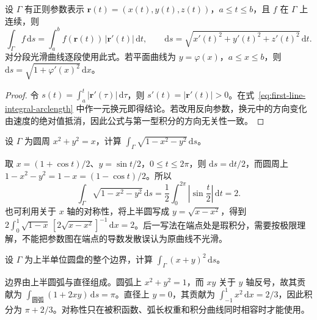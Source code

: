 \begin{theorem}
\label{thm:first-line-integral-parametric}
设 $\Gamma$ 有正则参数表示 $\boldsymbol r(t)=(x(t),y(t),z(t))$，$a\leq t\leq b$，且 $f$ 在 $\Gamma$ 上连续，则
\begin{equation}
\label{eq:first-line-integral-parametric}
    \int_\Gamma f\,\mathrm ds
    =\int_a^b f(\boldsymbol r(t))\,|\boldsymbol r'(t)|\,\mathrm dt,
    \qquad
    \mathrm ds=\sqrt{x'(t)^2+y'(t)^2+z'(t)^2}\,\mathrm dt.
\end{equation}
对分段光滑曲线逐段使用此式。若平面曲线为 $y=\varphi(x)$，$a\leq x\leq b$，则 $\mathrm ds=\sqrt{1+\varphi'(x)^2}\,\mathrm dx$。
\end{theorem}

\begin{proof}
令 $s(t)=\int_a^t|\boldsymbol r'(\tau)|\,\mathrm d\tau$，则 $s'(t)=|\boldsymbol r'(t)|>0$。在式~\eqref{eq:first-line-integral-arclength} 中作一元换元即得结论。若改用反向参数，换元中的方向变化由速度的绝对值抵消，因此公式与第一型积分的方向无关性一致。
\end{proof}

\begin{example}
\label{ex:first-line-integral-offset-circle}
设 $\Gamma$ 为圆周 $x^2+y^2=x$，计算 $\int_\Gamma\sqrt{1-x^2-y^2}\,\mathrm ds$。
\end{example}
\begin{solve}
取 $x=(1+\cos t)/2$、$y=\sin t/2$，$0\leq t\leq2\pi$，则 $\mathrm ds=\mathrm dt/2$，而圆周上 $1-x^2-y^2=1-x=(1-\cos t)/2$。所以
\[
    \int_\Gamma\sqrt{1-x^2-y^2}\,\mathrm ds
    =\frac12\int_0^{2\pi}\left|\sin\frac t2\right|\,\mathrm dt=2.
\]
也可利用关于 $x$ 轴的对称性，将上半圆写成 $y=\sqrt{x-x^2}$，得到 $2\int_0^1\sqrt{1-x}\,[2\sqrt{x-x^2}]^{-1}\,\mathrm dx=2$。后一写法在端点处是瑕积分，需要按极限理解，不能把参数图在端点的导数发散误认为原曲线不光滑。
\end{solve}

\begin{example}
\label{ex:first-line-integral-semicircle-boundary}
设 $\Gamma$ 为上半单位圆盘的整个边界，计算 $\int_\Gamma(x+y)^2\,\mathrm ds$。
\end{example}
\begin{solve}
边界由上半圆弧与直径组成。圆弧上 $x^2+y^2=1$，而 $xy$ 关于 $y$ 轴反号，故其贡献为 $\int_{\text{圆弧}}(1+2xy)\,\mathrm ds=\pi$。直径上 $y=0$，其贡献为 $\int_{-1}^1x^2\,\mathrm dx=2/3$，因此积分为 $\pi+2/3$。对称性只在被积函数、弧长权重和积分曲线同时相容时才能使用。
\end{solve}

